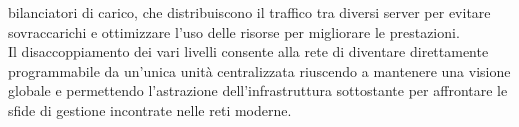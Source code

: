 bilanciatori di carico, che distribuiscono il traffico tra diversi server per evitare sovraccarichi
e ottimizzare l'uso delle risorse per migliorare le prestazioni. 
\\Il disaccoppiamento dei vari livelli consente alla rete di diventare direttamente programmabile da un'unica unità
centralizzata riuscendo a mantenere una visione globale e permettendo l'astrazione dell'infrastruttura sottostante per affrontare le sfide 
di gestione incontrate nelle reti moderne.

